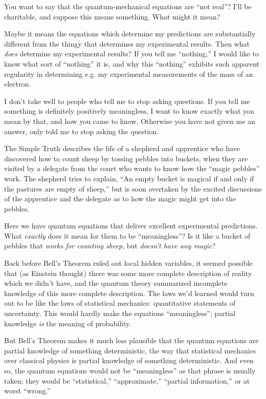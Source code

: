 {
 You want to say that the quantum-mechanical equations are
``not real''? I'll
be charitable, and suppose this means something. What might it mean?}

{
 Maybe it means the equations which determine my predictions are
substantially different from the thingy that determines my experimental
results. Then what \textit{does} determine my experimental results? If
you tell me ``nothing,'' I would
like to know what sort of
``nothing'' it is, and why this
``nothing'' exhibits such apparent
regularity in determining e.g. my experimental measurements of the mass
of an electron.}

{
 I don't take well to people who tell me to stop
asking questions. If you tell me something is definitely positively
meaningless, I want to know exactly what you mean by that, and how you
came to know. Otherwise you have not given me an answer, only told me
to stop asking the question.}

{
 The Simple Truth describes the life of a shepherd and apprentice
who have discovered how to count sheep by tossing pebbles into buckets,
when they are visited by a delegate from the court who wants to know
how the ``magic pebbles'' work. The
shepherd tries to explain, ``An empty bucket is
magical if and only if the pastures are empty of
sheep,'' but is soon overtaken by the excited
discussions of the apprentice and the delegate as to how the magic
might get into the pebbles.}

{
 Here we have quantum equations that deliver excellent experimental
predictions. What \textit{exactly} does it mean for them to be
``meaningless''? Is it like a bucket
of pebbles that \textit{works for counting sheep}, but
\textit{doesn't have any magic}?}

{
 Back before Bell's Theorem ruled out local hidden
variables, it seemed possible that (as Einstein thought) there was some
more complete description of reality which we didn't
have, and the quantum theory summarized incomplete knowledge of this
more complete description. The laws we'd learned would
turn out to be like the laws of statistical mechanics: quantitative
statements of uncertainty. This would hardly make the equations
``meaningless''; partial knowledge
\textit{is} the meaning of probability.}

{
 But Bell's Theorem makes it much less plausible
that the quantum equations are partial knowledge of something
deterministic, the way that statistical mechanics over classical
physics is partial knowledge of something deterministic. And even so,
the quantum equations would not be
``meaningless'' as that phrase is
usually taken; they would be
``statistical,''
``approximate,''
``partial information,'' or at worst
``wrong.''}

